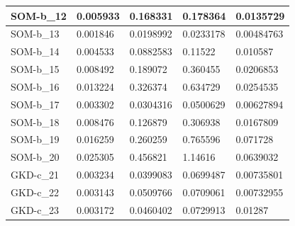 \documentclass[11pt,a4paper]{article}
\begin{document}
\begin{table}[H]
\begin{tabular}{l|l|l|l|l|}
			\multicolumn{1}{|l|}{SOM-b\_12} & 0.005933                    & 0.168331                            & 0.178364                             & 0.0135729                      \\ \hline
			\multicolumn{1}{|l|}{SOM-b\_13} & 0.001846                    & 0.0198992                           & 0.0233178                            & 0.00484763                     \\ \hline
			\multicolumn{1}{|l|}{SOM-b\_14} & 0.004533                    & 0.0882583                           & 0.11522                              & 0.010587                       \\ \hline
			\multicolumn{1}{|l|}{SOM-b\_15} & 0.008492                    & 0.189072                            & 0.360455                             & 0.0206853                      \\ \hline
			\multicolumn{1}{|l|}{SOM-b\_16} & 0.013224                    & 0.326374                            & 0.634729                             & 0.0254535                      \\ \hline
			\multicolumn{1}{|l|}{SOM-b\_17} & 0.003302                    & 0.0304316                           & 0.0500629                            & 0.00627894                     \\ \hline
			\multicolumn{1}{|l|}{SOM-b\_18} & 0.008476                    & 0.126879                            & 0.306938                             & 0.0167809                      \\ \hline
			\multicolumn{1}{|l|}{SOM-b\_19} & 0.016259                    & 0.260259                            & 0.765596                             & 0.071728                       \\ \hline
			\multicolumn{1}{|l|}{SOM-b\_20} & 0.025305                    & 0.456821                            & 1.14616                              & 0.0639032                      \\ \hline
			\multicolumn{1}{|l|}{GKD-c\_21} & 0.003234                    & 0.0399083                           & 0.0699487                            & 0.00735801                     \\ \hline
			\multicolumn{1}{|l|}{GKD-c\_22} & 0.003143                    & 0.0509766                           & 0.0709061                            & 0.00732955                     \\ \hline
			\multicolumn{1}{|l|}{GKD-c\_23} & 0.003172                    & 0.0460402                           & 0.0729913                            & 0.01287                        \\ \hline

\end{tabular}
\end{table}
\end{document}
